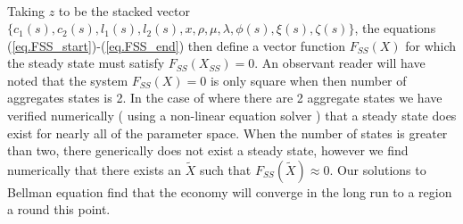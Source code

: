 \documentclass[thmsb,11pt]{article}
\begin{document}
{\begin{subequations}
\begin{align}
\end{align}\end{subequations}  Taking $z$ to be the stacked vector $\{c_1(s),c_2(s),l_1(s),l_2(s),x,\rho,\mu,\lambda,\phi(s),\xi(s),\zeta(s)\}$, the equations (\ref{eq.FSS_start})-(\ref{eq.FSS_end}) then define a vector function $F_{SS}(X)$ for which the steady state must satisfy $F_{SS}(X_{SS}) = 0$.  An observant reader will have noted that the system $F_{SS}(X) = 0$ is only square when then number of aggregates states is 2.   In the case of where there are 2 aggregate states we have verified numerically ( using a non-linear equation solver ) that a steady state does exist for nearly all of the parameter space.  When the number of states is greater than two, there generically does not exist a steady state, however we find numerically that there exists an $\tilde X$ such that $F_{SS}(\tilde X) \approx 0$.  Our solutions to Bellman equation find that the economy will converge in the long run to a region a round this point.
}
\end{document}
